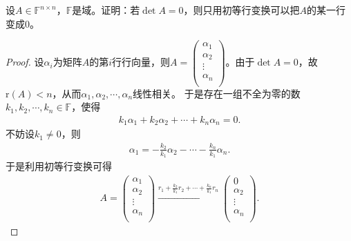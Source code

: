 \documentclass[../../main.tex]{subfiles}
\begin{document}
\begin{example}
设\(A \in \mathbb{F}^{n\times n}\)，\(\mathbb{F}\)是域。证明：若\(\det A = 0\)，则只用初等行变换可以把\(A\)的某一行变成\(0\)。
\end{example}
\begin{proof}
设\(\alpha_i\)为矩阵\(A\)的第\(i\)行行向量，则\(A=\left( \begin{array}{c} \alpha_1\\ \alpha_2\\ \vdots\\ \alpha_n\\ \end{array} \right)\)。由于\(\det A=0\)，故\(\text{r}(A) < n\)，从而\(\alpha_1,\alpha_2,\cdots,\alpha_n\)线性相关。
于是存在一组不全为零的数\(k_1,k_2,\cdots,k_n\in \mathbb{F}\)，使得
\begin{align*}
k_1\alpha_1 + k_2\alpha_2 + \cdots + k_n\alpha_n = 0.
\end{align*}
不妨设\(k_1\ne 0\)，则
\begin{align*}
\alpha_1 = -\frac{k_2}{k_1}\alpha_2 - \cdots - \frac{k_n}{k_1}\alpha_n.
\end{align*}
于是利用初等行变换可得
\begin{align*}
A = \left( \begin{array}{c} \alpha_1\\ \alpha_2\\ \vdots\\ \alpha_n\\ \end{array} \right) \xrightarrow{r_1 + \frac{k_2}{k_1}r_2 + \cdots + \frac{k_n}{k_1}r_n} \left( \begin{array}{c} 0\\ \alpha_2\\ \vdots\\ \alpha_n\\ \end{array} \right).
\end{align*}
\end{proof}
\end{document}
